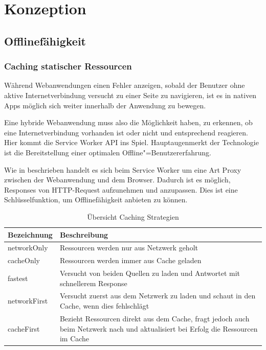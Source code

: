 \chapter{Konzeption}
\label{sec_konzeption}

\section{Offlinefähigkeit}
\label{sec_konzeption_offline}

\subsection{Caching statischer Ressourcen}
\label{subsec_konzept_caching-statische-ressourcen}

Während Webanwendungen einen Fehler anzeigen, sobald der Benutzer ohne aktive Internetverbindung versucht zu einer Seite zu navigieren, ist es in nativen Apps möglich sich weiter innerhalb der Anwendung zu bewegen. 

Eine hybride Webanwendung muss also die Möglichkeit haben, zu erkennen, ob eine Internetverbindung vorhanden ist oder nicht und entsprechend reagieren. Hier kommt die Service Worker API ins Spiel. Hauptaugenmerkt der Technologie ist die Bereitstellung einer optimalen Offline"=Benutzererfahrung.   

Wie in  beschrieben handelt es sich beim Service Worker um eine Art Proxy zwischen der Webanwendung und dem Browser. Dadurch ist es möglich, Responses von HTTP-Request aufzunehmen und anzupassen. Dies ist eine Schlüsselfunktion, um Offlinefähigkeit anbieten zu können.

\begin{table}[h]
\centering
\begin{tabularx}{\textwidth}{| l | X | }
    \hline
    \textbf{Bezeichnung} & \textbf{Beschreibung} \\
    \hline
    networkOnly & Ressourcen werden nur aus Netzwerk geholt \\
    \hline    
    cacheOnly & Ressourcen werden immer aus Cache geladen \\
    \hline
    fastest & Versucht von beiden Quellen zu laden und Antwortet mit schnellerem Response \\
    \hline
    networkFirst & Versucht zuerst aus dem Netzwerk zu laden und schaut in den Cache, wenn dies fehlschlägt \\
    \hline
    cacheFirst & Bezieht Ressourcen direkt aus dem Cache, fragt jedoch auch beim Netzwerk nach und aktualisiert bei Erfolg die Ressourcen im Cache \\
    \hline
\end{tabularx}
\caption{Übersicht Caching Strategien}
\label{tbl_konzeption_caching-strategien}
\end{table}

